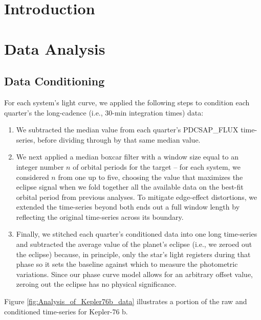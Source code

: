\documentclass[manuscript]{aastex}
\begin{document}


\section{Introduction}

\section{Data Analysis}
\subsection{Data Conditioning}
For each system's light curve, we applied the following steps to condition each quarter's the long-cadence (i.e., 30-min integration times) data:
\begin{enumerate}
\item We subtracted the median value from each quarter's PDCSAP\_FLUX time-series, before dividing through by that same median value.
\item We next applied a median boxcar filter with a window size equal to an integer number $n$ of orbital periods for the target -- for each system, we considered $n$ from one up to five, choosing the value that maximizes the eclipse signal when we fold together all the available data on the best-fit orbital period from previous analyses. To mitigate edge-effect distortions, we extended the time-series beyond both ends out a full window length by reflecting the original time-series across its boundary.
\item Finally, we stitched each quarter's conditioned data into one long time-series and subtracted the average value of the planet's eclipse (i.e., we zeroed out the eclipse) because, in principle, only the star's light registers during that phase so it sets the baseline against which to measure the photometric variations. Since our phase curve model allows for an arbitrary offset value, zeroing out the eclipse has no physical significance.
\end{enumerate}
Figure \ref{fig:Analysis_of_Kepler76b_data} illustrates a portion of the raw and conditioned time-series for Kepler-76 b. 
\end{document}

